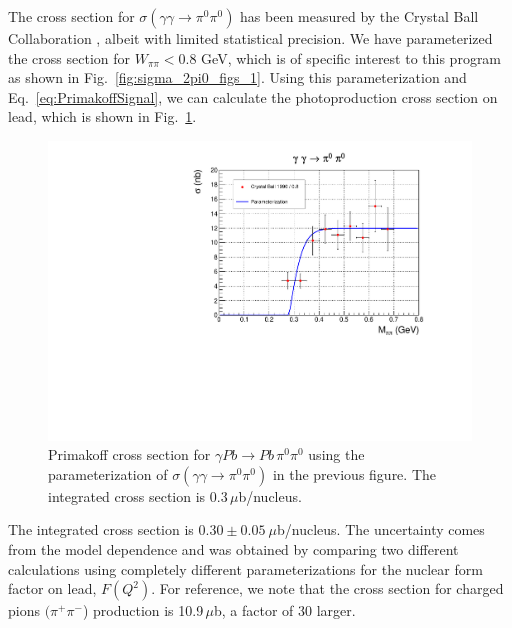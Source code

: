 The cross section for $\sigma(\gamma\gamma\rightarrow\pi^0\pi^0)$ has
been measured by the Crystal Ball Collaboration
\cite{Marsiske:1990hx}, albeit with limited statistical precision. We
have parameterized the cross section for $W_{\pi\pi}<0.8$ GeV, which
is of specific interest to this program as shown in
Fig.~\ref{fig:sigma_2pi0_figs_1}. Using this parameterization and
Eq.~\ref{eq:PrimakoffSignal}, we can calculate the photoproduction
cross section on lead, which is shown in
Fig.~\ref{fig:sigma_2pi0_figs_2}.
\begin{figure}[tph]
\centering
\includegraphics[page=2,width=4.75in]{figures/sigma_2pi0_figs.pdf}
\caption{Primakoff cross section for $\gamma Pb \rightarrow Pb\, \pi^0 \pi^0$ using the parameterization of  $\sigma(\gamma\gamma\rightarrow \pi^0\pi^0)$ in the previous figure. The integrated cross section is 0.3\,$\mu$b/nucleus.
\label{fig:sigma_2pi0_figs_2}}
\end{figure}
The integrated cross section is $0.30 \pm 0.05~\mu$b/nucleus. The
uncertainty comes from the model dependence and was obtained by
comparing two different calculations using completely different
parameterizations for the nuclear form factor on lead, $F(Q^2)$. For
reference,
we note that the cross section for charged pions $(\pi^+\pi^-$)
production is 10.9\,$\mu$b, a factor of 30 larger.

